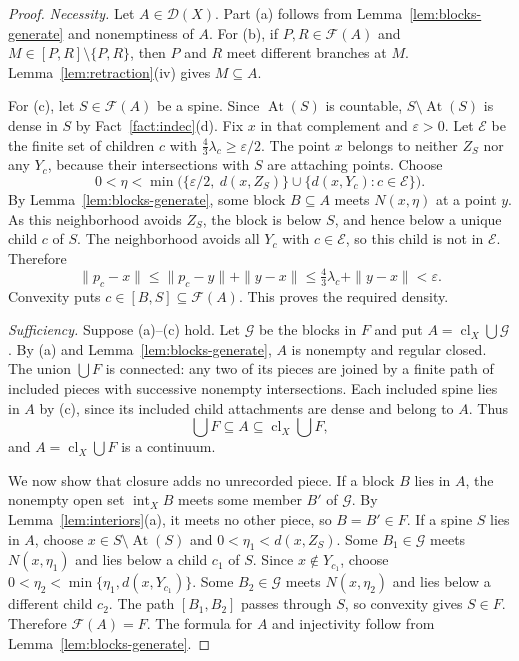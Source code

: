 \documentclass[11pt]{amsart}
\theoremstyle{definition}
\theoremstyle{remark}
\newcommand{\clX}{\operatorname{cl}_X}
\newcommand{\intX}{\operatorname{int}_X}
\newcommand{\At}{\operatorname{At}}
\newcommand{\D}{\mathcal{D}}
\newcommand{\Fc}{\mathcal{F}}
\newcommand{\Gc}{\mathcal{G}}
\newcommand{\Ec}{\mathcal{E}}
\begin{document}
\begin{proof}
\emph{Necessity.} Let $A\in\D(X)$. Part (a) follows from Lemma~\ref{lem:blocks-generate} and nonemptiness of $A$. For (b), if $P,R\in\Fc(A)$ and $M\in[P,R]\setminus\{P,R\}$, then $P$ and $R$ meet different branches at $M$. Lemma~\ref{lem:retraction}(iv) gives $M\subseteq A$.

For (c), let $S\in\Fc(A)$ be a spine. Since $\At(S)$ is countable, $S\setminus\At(S)$ is dense in $S$ by Fact~\ref{fact:indec}(d). Fix $x$ in that complement and $\varepsilon>0$. Let $\Ec$ be the finite set of children $c$ with $\frac43\lambda_c\ge\varepsilon/2$. The point $x$ belongs to neither $Z_S$ nor any $Y_c$, because their intersections with $S$ are attaching points. Choose
\[
0<\eta<\min\bigl(\{\varepsilon/2,\ d(x,Z_S)\}\cup\{d(x,Y_c):c\in\Ec\}\bigr).
\]
By Lemma~\ref{lem:blocks-generate}, some block $B\subseteq A$ meets $N(x,\eta)$ at a point $y$. As this neighborhood avoids $Z_S$, the block is below $S$, and hence below a unique child $c$ of $S$. The neighborhood avoids all $Y_c$ with $c\in\Ec$, so this child is not in $\Ec$. Therefore
\[
\|p_c-x\|\le\|p_c-y\|+\|y-x\|\le\tfrac43\lambda_c+\|y-x\|<\varepsilon.
\]
Convexity puts $c\in[B,S]\subseteq\Fc(A)$. This proves the required density.

\emph{Sufficiency.} Suppose (a)--(c) hold. Let $\Gc$ be the blocks in $F$ and put $A=\clX\bigcup\Gc$. By (a) and Lemma~\ref{lem:blocks-generate}, $A$ is nonempty and regular closed. The union $\bigcup F$ is connected: any two of its pieces are joined by a finite path of included pieces with successive nonempty intersections. Each included spine lies in $A$ by (c), since its included child attachments are dense and belong to $A$. Thus
\[
\bigcup F\subseteq A\subseteq\clX\bigcup F,
\]
and $A=\clX\bigcup F$ is a continuum.

We now show that closure adds no unrecorded piece. If a block $B$ lies in $A$, the nonempty open set $\intX B$ meets some member $B'$ of $\Gc$. By Lemma~\ref{lem:interiors}(a), it meets no other piece, so $B=B'\in F$. If a spine $S$ lies in $A$, choose $x\in S\setminus\At(S)$ and $0<\eta_1<d(x,Z_S)$. Some $B_1\in\Gc$ meets $N(x,\eta_1)$ and lies below a child $c_1$ of $S$. Since $x\notin Y_{c_1}$, choose $0<\eta_2<\min\{\eta_1,d(x,Y_{c_1})\}$. Some $B_2\in\Gc$ meets $N(x,\eta_2)$ and lies below a different child $c_2$. The path $[B_1,B_2]$ passes through $S$, so convexity gives $S\in F$. Therefore $\Fc(A)=F$. The formula for $A$ and injectivity follow from Lemma~\ref{lem:blocks-generate}.
\end{proof}
\end{document}
